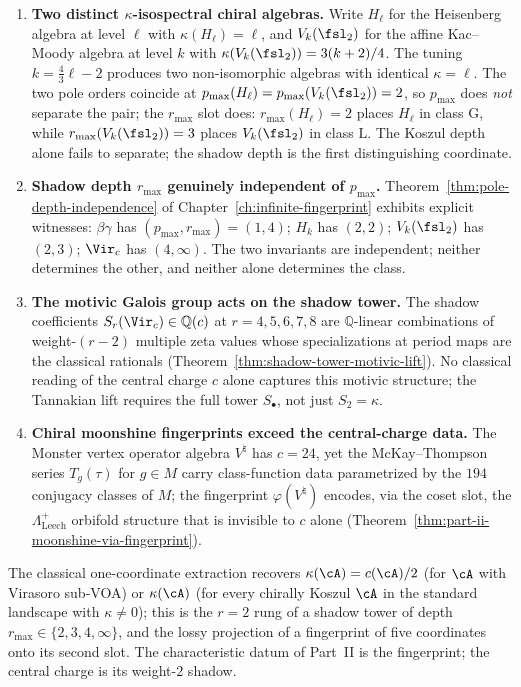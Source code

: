 \begin{enumerate}
 \item \textbf{Two distinct $\kappa$-isospectral chiral algebras.}
 Write $H_{\ell}$ for the Heisenberg algebra at level $\ell$ with
 $\kappa(H_{\ell}) = \ell$, and $V_{k}(\fsl_2)$ for the affine
 Kac--Moody algebra at level $k$ with
 $\kappa(V_{k}(\fsl_2)) = 3(k+2)/4$. The tuning
 $k = \tfrac{4}{3}\ell - 2$ produces two non-isomorphic algebras
 with identical $\kappa = \ell$. The two pole orders coincide at
 $p_{\max}(H_{\ell}) = p_{\max}(V_{k}(\fsl_2)) = 2$, so $p_{\max}$
 does \emph{not} separate the pair; the $r_{\max}$ slot does:
 $r_{\max}(H_{\ell}) = 2$ places $H_{\ell}$ in class $\mathrm{G}$,
 while $r_{\max}(V_{k}(\fsl_2)) = 3$ places $V_{k}(\fsl_2)$ in
 class $\mathrm{L}$. The Koszul depth alone fails to separate;
 the shadow depth is the first distinguishing coordinate.
 \item \textbf{Shadow depth $r_{\max}$ genuinely independent of
 $p_{\max}$.} Theorem~\ref{thm:pole-depth-independence} of
 Chapter~\ref{ch:infinite-fingerprint} exhibits explicit
 witnesses: $\beta\gamma$ has $(p_{\max}, r_{\max}) = (1, 4)$;
 $H_k$ has $(2, 2)$; $V_k(\fsl_2)$ has $(2, 3)$; $\Vir_c$ has
 $(4, \infty)$. The two invariants are independent; neither
 determines the other, and neither alone determines the class.
 \item \textbf{The motivic Galois group acts on the shadow
 tower.} The shadow coefficients
 $S_r(\Vir_c) \in \mathbb{Q}(c)$ at $r = 4, 5, 6, 7, 8$ are
 $\mathbb{Q}$-linear combinations of weight-$(r-2)$ multiple
 zeta values whose specializations at period maps are the
 classical rationals (Theorem~\ref{thm:shadow-tower-motivic-lift}).
 No classical reading of the central charge $c$ alone captures
 this motivic structure; the Tannakian lift requires the full
 tower $S_\bullet$, not just $S_2 = \kappa$.
 \item \textbf{Chiral moonshine fingerprints exceed the
 central-charge data.} The Monster vertex operator algebra
 $V^\natural$ has $c = 24$, yet the McKay--Thompson series
 $T_g(\tau)$ for $g \in M$ carry class-function data
 parametrized by the $194$ conjugacy classes of $M$; the
 fingerprint $\varphi(V^\natural)$ encodes, via the coset slot,
 the $\Lambda_{\mathrm{Leech}}^+$ orbifold structure that is
 invisible to $c$ alone
 (Theorem~\ref{thm:part-ii-moonshine-via-fingerprint}).
\end{enumerate}

The classical one-coordinate extraction recovers
$\kappa(\cA) = c(\cA)/2$ (for $\cA$ with Virasoro sub-VOA) or
$\kappa(\cA)$ (for every chirally Koszul $\cA$ in the standard
landscape with $\kappa \ne 0$); this is the $r = 2$ rung of a
shadow tower of depth $r_{\max} \in \{2, 3, 4, \infty\}$, and the
lossy projection of a fingerprint of five coordinates onto its
second slot. The
characteristic datum of Part~II is the fingerprint; the central
charge is its weight-$2$ shadow.

